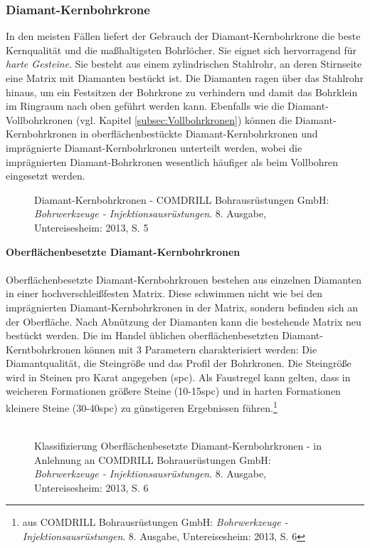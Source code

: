 \documentclass[12pt,a4paper,draft]{scrartcl} %
\begin{document}
\subsubsection{Diamant-Kernbohrkrone}
In den meisten Fällen liefert der Gebrauch der Diamant-Kernbohrkrone die beste Kernqualität und die maßhaltigsten Bohrlöcher. Sie eignet sich hervorragend für \emph{harte Gesteine}. Sie besteht aus einem zylindrischen Stahlrohr, an deren Stirnseite eine Matrix mit Diamanten bestückt ist. Die Diamanten ragen über das Stahlrohr hinaus, um ein Festsitzen der Bohrkrone zu verhindern und damit das Bohrklein im Ringraum nach oben geführt werden kann. Ebenfalls wie die Diamant-Vollbohrkronen (vgl. Kapitel \ref{subsec:Vollbohrkronen}) können die Diamant-Kernbohrkronen in oberflächenbestückte Diamant-Kernbohrkronen und imprägnierte Diamant-Kernbohrkronen unterteilt werden, wobei die imprägnierten Diamant-Bohrkronen wesentlich häufiger als beim Vollbohren eingesetzt werden.\\

\begin{figure}[H]
\centering
\caption{Diamant-Kernbohrkronen - COMDRILL Bohrausrüstungen GmbH: \emph{Bohrwerkzeuge - Injektionsausrüstungen}. 8. Ausgabe, Untereisesheim: 2013, S. 5}
\end{figure}

\newpage
\textbf{Oberflächenbesetzte Diamant-Kernbohrkronen}\\\\
Oberflächenbesetzte Diamant-Kernbohrkronen bestehen aus einzelnen Diamanten in einer hochverschleißfesten Matrix. Diese schwimmen nicht wie bei den imprägnierten Diamant-Kernbohrkronen in der Matrix, sondern befinden sich an der Oberfläche. Nach Abnützung der Diamanten kann die bestehende Matrix neu bestückt werden. Die im Handel üblichen oberflächenbesetzten Diamant-Kerntbohrkronen können mit 3 Parametern charakterisiert werden: Die Diamantqualität, die Steingröße und das Profil der Bohrkronen. Die Steingröße wird in Steinen pro Karat angegeben (spc). Als Faustregel kann gelten, dass in weicheren Formationen größere Steine (10-15spc) und in harten Formationen kleinere Steine (30-40spc) zu günstigeren Ergebnissen führen.\footnote{aus COMDRILL Bohrausrüstungen GmbH: \emph{Bohrwerkzeuge - Injektionsausrüstungen}. 8. Ausgabe, Untereisesheim: 2013, S. 6}\\\\

\begin{figure}[H]
\centering
\caption{Klassifizierung Oberflächenbesetzte Diamant-Kernbohrkronen - in Anlehnung an COMDRILL Bohrausrüstungen GmbH: \emph{Bohrwerkzeuge - Injektionsausrüstungen}. 8. Ausgabe, Untereisesheim: 2013, S. 6}
\end{figure}
\end{document}
